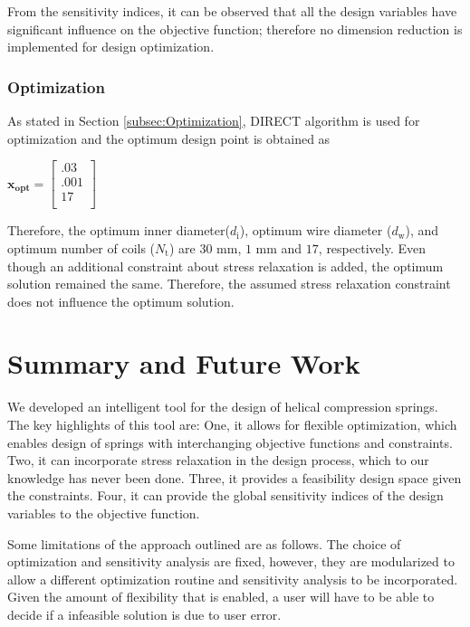 \documentclass[10pt]{article}
\begin{document}
From the sensitivity indices, it can be observed that all the design variables have significant influence on the objective function; therefore no dimension reduction is implemented for design optimization. 


\subsubsection{Optimization}
	
	As stated in Section \ref{subsec:Optimization}, DIRECT algorithm is used for optimization and the optimum design point is obtained as 
	\begin{center}
	$\mathbf{x_{opt}} =
	\left[
	\begin{array}{c}
	 	 .03 \\
	 	 .001 \\
		 17    \\ 
		
	 \end{array}
	 \right]
$	
\end{center}
    Therefore, the optimum inner diameter($d_{\text{i}}$), optimum wire diameter ($d_{\text{w}}$), and optimum number of coils ($N_{\text{t}}$) are $30$ mm, $1 $ mm and $17$, respectively. Even though an additional constraint about stress relaxation is added, the optimum solution remained the same. Therefore, the assumed stress relaxation constraint does not influence the optimum solution.
    
\section{Summary and Future Work}
\label{sec:Summary}

We developed an intelligent tool for the design of helical compression springs. The key highlights of this tool are: One, it allows for flexible optimization, which enables design of springs with interchanging objective functions and constraints. Two, it can incorporate stress relaxation in the design process, which to our knowledge has never been done. Three, it provides a feasibility design space given the constraints. Four, it can provide the global sensitivity indices of the design variables to the objective function. 

Some limitations of the approach outlined are as follows. The choice of optimization and sensitivity analysis are fixed, however, they are modularized to allow a different optimization routine and sensitivity analysis to be incorporated. Given the amount of flexibility that is enabled, a user will have to be able to decide if a infeasible solution is due to user error. 
\end{document}
